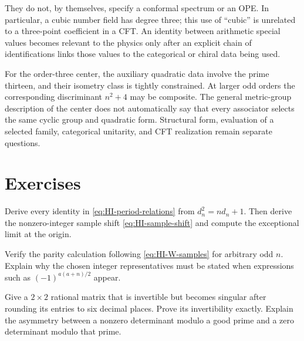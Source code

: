 They do not, by themselves, specify a conformal spectrum or an OPE.
In particular, a cubic number field has degree three; this use of
``cubic'' is unrelated to a three-point coefficient in a CFT.
An identity between arithmetic special values becomes relevant to
the physics only after an explicit chain of identifications links
those values to the categorical or chiral data being used.

For the order-three center, the auxiliary quadratic data involve
the prime thirteen, and their isometry class is tightly constrained.
At larger odd orders the corresponding discriminant $n^2+4$ may
be composite.  The general metric-group description of the center
does not automatically say that every associator selects the same
cyclic group and quadratic form.  Structural form, evaluation of a
selected family, categorical unitarity, and CFT realization remain
separate questions.

\section{Exercises}

\begin{exercise}\label{ex:HI-periods}
Derive every identity in \eqref{eq:HI-period-relations} from
$d_n^2=nd_n+1$.  Then derive the nonzero-integer sample shift
\eqref{eq:HI-sample-shift} and compute the exceptional limit at
the origin.

\par\smallskip{}\par
\end{exercise}

\begin{exercise}\label{ex:HI-sign}
Verify the parity calculation following \eqref{eq:HI-W-samples}
for arbitrary odd $n$.  Explain why the chosen integer
representatives must be stated when expressions such as
$(-1)^{a(a+n)/2}$ appear.

\par\smallskip{}\par
\end{exercise}

\begin{exercise}\label{ex:exact-rank}
Give a $2\times2$ rational matrix that is invertible but becomes
singular after rounding its entries to six decimal places.  Prove
its invertibility exactly.  Explain the asymmetry between a
nonzero determinant modulo a good prime and a zero determinant
modulo that prime.

\par\smallskip{}\par
\end{exercise}

